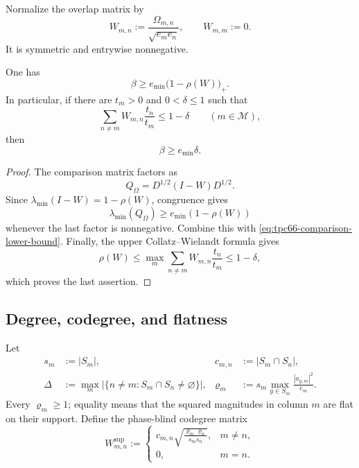 Normalize the overlap matrix by
\begin{equation}
 W_{m,n}:=
 \frac{\Omega_{m,n}}{\sqrt{e_me_n}},
 \qquad
 W_{m,m}:=0.
 \label{eq:tpc66-normalized-overlap-matrix}
\end{equation}
It is symmetric and entrywise nonnegative.

\begin{corollary}
\label{cor:tpc66-spectral-radius-certificate}
One has
\begin{equation}
 \boxed{
 \beta
 \ge
 e_{\min}\bigl(1-\rho(W)\bigr)_+.}
 \label{eq:tpc66-spectral-radius-lower}
\end{equation}
In particular, if there are \(t_m>0\) and \(0<\delta\le1\) such that
\begin{equation}
 \sum_{n\ne m}W_{m,n}\frac{t_n}{t_m}
 \le1-\delta
 \qquad(m\in\mathcal M),
 \label{eq:tpc66-weighted-schur-margin}
\end{equation}
then
\begin{equation}
 \beta\ge e_{\min}\delta.
 \label{eq:tpc66-weighted-schur-lower}
\end{equation}
\end{corollary}

\begin{proof}
The comparison matrix factors as
\[
 Q_\Omega=D^{1/2}(I-W)D^{1/2}.
\]
Since
\(\lambda_{\min}(I-W)=1-\rho(W)\), congruence gives
\[
 \lambda_{\min}(Q_\Omega)
 \ge e_{\min}(1-\rho(W))
\]
whenever the last factor is nonnegative.  Combine this with
\eqref{eq:tpc66-comparison-lower-bound}.  Finally, the upper
Collatz--Wielandt formula gives
\[
 \rho(W)
 \le
 \max_m\sum_{n\ne m}W_{m,n}\frac{t_n}{t_m}
 \le1-\delta,
\]
which proves the last assertion.
\end{proof}

\subsection{Degree, codegree, and flatness}

Let
\begin{align}
 s_m&:=|S_m|,
 &
 c_{m,n}&:=|S_m\cap S_n|,
 \label{eq:tpc66-support-codegree}\\
 \Delta&:=
 \max_m|\{n\ne m:S_m\cap S_n\ne\varnothing\}|,
 &
 \varrho_m&:=
 s_m\max_{y\in S_m}\frac{|a_{y,m}|^2}{e_m}.
 \label{eq:tpc66-degree-flatness}
\end{align}
Every \(\varrho_m\ge1\); equality means that the squared magnitudes in
column \(m\) are flat on their support.  Define the phase-blind codegree
matrix
\begin{equation}
 W^{\mathrm{sup}}_{m,n}
 :=
 \begin{cases}
 \displaystyle
 c_{m,n}
 \sqrt{\frac{\varrho_m\varrho_n}{s_ms_n}},
 &m\ne n,\\[3mm]
 0,&m=n.
 \end{cases}
 \label{eq:tpc66-support-codegree-matrix}
\end{equation}

